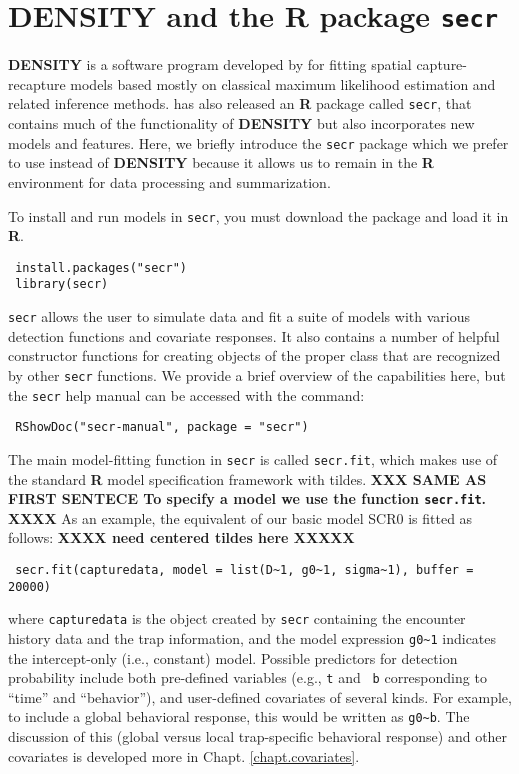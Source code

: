 \section{DENSITY and the R package \mbox{\tt secr} }
\label{mle.sec.secr}

{\bf DENSITY} is a software program developed by \citet{efford:2004}
for fitting spatial capture-recapture models based mostly on classical
maximum likelihood estimation and related inference methods.
\citet{efford:2011} has also released an {\bf R} package called
\mbox{\tt secr}, that contains much of the functionality of {\bf
  DENSITY} but also incorporates new models and features.  Here, we
briefly introduce the \mbox{\tt secr} package which we prefer to use
instead of {\bf DENSITY} because it allows us to remain in the {\bf R}
environment for data processing and summarization. 

To install
and run models in \mbox{\tt secr}, you must download the package and
load it in
{\bf R}.
\begin{verbatim}
 install.packages("secr")
 library(secr)
\end{verbatim}
\mbox{\tt secr} allows the user to simulate data and fit a suite of models with
various detection functions and covariate responses. It also contains
a number of helpful constructor functions for creating objects of the
proper class that are recognized by other \mbox{\tt secr}
functions. We provide a brief overview of the capabilities here, but
the \mbox{\tt secr} help manual can be accessed with the command:
\begin{verbatim}
 RShowDoc("secr-manual", package = "secr")
\end{verbatim}


The main model-fitting function in   \mbox{\tt secr} is called
\mbox{\tt secr.fit}, which 
makes use of the
standard {\bf R} model specification framework with tildes. 
{\bf XXX SAME AS FIRST SENTECE
To specify a model we use the function \mbox{\tt secr.fit}. XXXX}
As an example, the equivalent of our
basic model SCR0  is fitted as follows: {\bf XXXX need centered tildes
  here XXXXX}
\begin{verbatim}
 secr.fit(capturedata, model = list(D~1, g0~1, sigma~1), buffer = 20000)
\end{verbatim}
where \mbox{\tt capturedata} is the  object created by \mbox{\tt secr}
containing the encounter history data and the trap information, and
the model expression \verb#g0~1# indicates the intercept-only (i.e.,
constant) model.  Possible predictors for detection probability
include both pre-defined variables (e.g., \mbox{\tt t} and \mbox{\tt
  b} corresponding to ``time'' and ``behavior''), and user-defined
covariates of several kinds.  For example, to include a global
behavioral response, this would be written as \verb#g0~b#.  The
discussion of this (global versus local trap-specific behavioral
response) and other covariates is developed more in
Chapt. \ref{chapt.covariates}.

